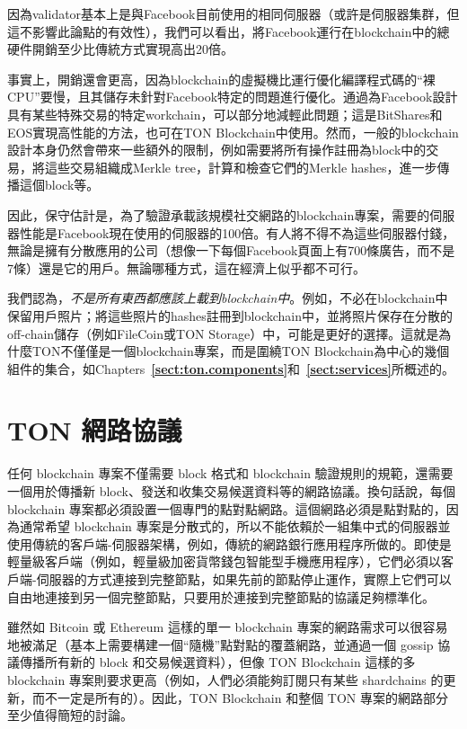 \documentclass[12pt,oneside]{article}
\def\refpoint#1{{\rm\textbf{\ref{#1}}}}
\let\ptref=\refpoint
\def\mysection#1{\section{#1}\fancyhead[C]{\textsc{Chapter \textbf{\thesection.} #1}}}
\begin{document}
因為validator基本上是與Facebook目前使用的相同伺服器（或許是伺服器集群，但這不影響此論點的有效性），我們可以看出，將Facebook運行在blockchain中的總硬件開銷至少比傳統方式實現高出20倍。

事實上，開銷還會更高，因為blockchain的虛擬機比運行優化編譯程式碼的“裸CPU”要慢，且其儲存未針對Facebook特定的問題進行優化。通過為Facebook設計具有某些特殊交易的特定workchain，可以部分地減輕此問題；這是BitShares和EOS實現高性能的方法，也可在TON Blockchain中使用。然而，一般的blockchain設計本身仍然會帶來一些額外的限制，例如需要將所有操作註冊為block中的交易，將這些交易組織成Merkle tree，計算和檢查它們的Merkle hashes，進一步傳播這個block等。

因此，保守估計是，為了驗證承載該規模社交網路的blockchain專案，需要的伺服器性能是Facebook現在使用的伺服器的100倍。有人將不得不為這些伺服器付錢，無論是擁有分散應用的公司（想像一下每個Facebook頁面上有700條廣告，而不是7條）還是它的用戶。無論哪種方式，這在經濟上似乎都不可行。

我們認為，{\em 不是所有東西都應該上載到blockchain中}。例如，不必在blockchain中保留用戶照片；將這些照片的hashes註冊到blockchain中，並將照片保存在分散的off-chain儲存（例如FileCoin或TON Storage）中，可能是更好的選擇。這就是為什麼TON不僅僅是一個blockchain專案，而是圍繞TON Blockchain為中心的幾個組件的集合，如Chapters~\ptref{sect:ton.components}和~\ptref{sect:services}所概述的。


%
%
%
%

\clearpage
\mysection{TON 網路協議}\label{sect:network}

任何 blockchain 專案不僅需要 block 格式和 blockchain 驗證規則的規範，還需要一個用於傳播新 block、發送和收集交易候選資料等的網路協議。換句話說，每個 blockchain 專案都必須設置一個專門的點對點網路。這個網路必須是點對點的，因為通常希望 blockchain 專案是分散式的，所以不能依賴於一組集中式的伺服器並使用傳統的客戶端-伺服器架構，例如，傳統的網路銀行應用程序所做的。即使是輕量級客戶端（例如，輕量級加密貨幣錢包智能型手機應用程序），它們必須以客戶端-伺服器的方式連接到完整節點，如果先前的節點停止運作，實際上它們可以自由地連接到另一個完整節點，只要用於連接到完整節點的協議足夠標準化。

雖然如 Bitcoin 或 Ethereum 這樣的單一 blockchain 專案的網路需求可以很容易地被滿足（基本上需要構建一個“隨機”點對點的覆蓋網路，並通過一個 gossip 協議傳播所有新的 block 和交易候選資料），但像 TON Blockchain 這樣的多 blockchain 專案則要求更高（例如，人們必須能夠訂閱只有某些 shardchains 的更新，而不一定是所有的）。因此，TON Blockchain 和整個 TON 專案的網路部分至少值得簡短的討論。
\end{document}
